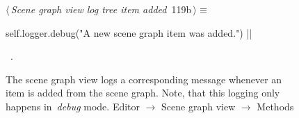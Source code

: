 \documentclass[%
    a4paper,    %
    justified,  %
    nobib,      %
    openany     %
]{tufte-book}
\makeatletter
\renewcommand{\label}[1]{\@tufte@label{##1}}%
\makeatother
\begin{document}
\begin{figure}[!htbp]
\begin{flushleft} \small
\begin{minipage}{\linewidth}\label{scrap59}\raggedright\small
{} $\langle\,${\itshape Scene graph view log tree item added}\nobreak\ {\footnotesize {119b}}$\,\rangle\equiv$
\vspace{-1ex}
\begin{pythoncode}
self.logger.debug("A new scene graph item was added.")
|\NWsep|
\end{pythoncode}
\vspace{1.5ex}
\footnotesize
\begin{list}{}{\setlength{\itemsep}{-\parsep}\setlength{\itemindent}{-\leftmargin}}
\item \NWtxtMacroRefIn\ .

\item{}
\end{list}
\end{minipage}\vspace{4ex}
\end{flushleft}
\caption{The scene graph view logs a corresponding message whenever an item is
  added from the scene graph. Note, that this logging only happens
  in~\emph{debug} mode.
  \newline{}\newline{}Editor $\rightarrow$ Scene graph view
  $\rightarrow$ Methods}
\end{figure}
\end{document}
